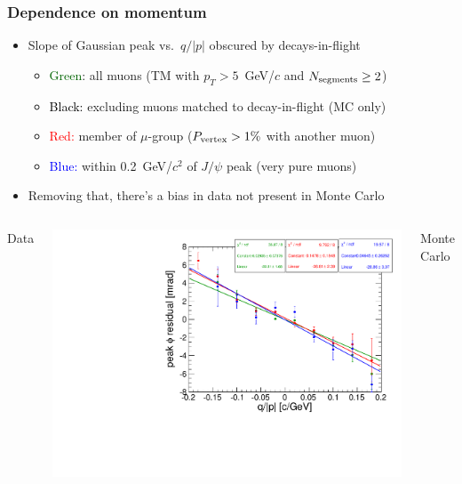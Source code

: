 \documentclass[compress]{beamer}
\newcommand{\s}[1]{{\mbox{\scriptsize #1}}}
\begin{document}
\begin{frame}
\frametitle{Dependence on momentum}
\begin{itemize}
\item Slope of Gaussian peak vs.\ $q/|p|$ obscured by decays-in-flight
\begin{itemize}\setlength{\itemsep}{0.2 cm}
\item \textcolor{darkgreen}{Green}: all muons (TM with $p_T > 5$~GeV/$c$ and $N_\s{segments} \ge 2$)
\item \textcolor{black}{Black:} excluding muons matched to decay-in-flight (MC only)
\item \textcolor{red}{Red:} member of $\mu$-group ($P_\s{vertex} > 1\%$ with another muon)
\item \textcolor{blue}{Blue:} within 0.2~GeV/$c^2$ of $J/\psi$ peak (very pure muons)
\end{itemize}
\item Removing that, there's a bias in data not present in Monte Carlo
\end{itemize}

\vspace{-0.5 cm}
\begin{columns}
\begin{center} Data \end{center}

\includegraphics[width=\linewidth]{datacuts_allmu_ingroup_jpsi.pdf}
\begin{center} Monte Carlo \end{center}


\end{columns}
\end{frame}
\end{document}
